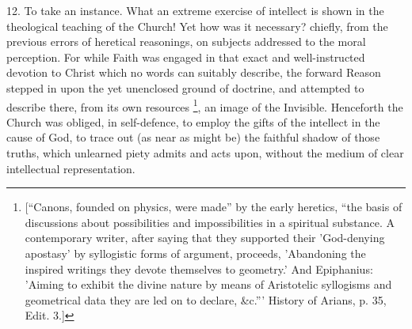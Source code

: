 12. To take an instance. What an extreme exercise of intellect is
shown in the theological teaching of the Church! Yet how was it
necessary? chiefly, from the previous errors of heretical reasonings,
on subjects addressed to the moral perception. For while Faith was
engaged in that exact and well-instructed devotion to Christ which no
words can suitably describe, the forward Reason stepped in upon the
yet unenclosed ground of doctrine, and attempted to describe there,
from its own resources \footnote{[``Canons, founded on physics, were made'' by the early
heretics, ``the basis of discussions about possibilities and
impossibilities in a spiritual substance. A contemporary writer, after
saying that they supported their 'God-denying apostasy' by syllogistic
forms of argument, proceeds, 'Abandoning the inspired writings they
devote themselves to geometry.' And Epiphanius: 'Aiming to exhibit the
divine nature by means of Aristotelic syllogisms and geometrical data
they are led on to declare, \&c.''' History of
Arians, p. 35,
Edit. 3.]},
an image of the Invisible. Henceforth the Church was obliged, in self-defence,
to employ the gifts of the intellect in the cause of God, to trace out
(as near as might be) the faithful shadow of those truths, which
unlearned piety admits and acts upon, without the medium of clear
intellectual representation.

